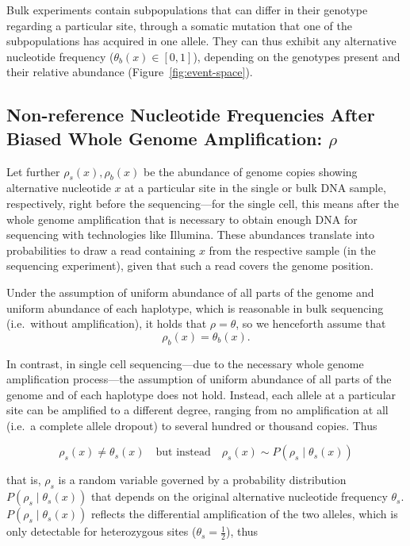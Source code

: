 \documentclass[authoryear,preprint,11pt]{scrartcl}
\newcommand{\Prob}{{P}}
\begin{document}
Bulk experiments contain subpopulations that can differ in their genotype regarding a particular site, through a somatic mutation that one of the subpopulations has acquired in one allele.
They can thus exhibit any alternative nucleotide frequency ($\theta_{b}(x) \in [0,1]$), depending on the genotypes present and their relative abundance (Figure~\ref{fig:event-space}).

\subsection{Non-reference Nucleotide Frequencies After Biased Whole Genome Amplification: $\rho$}
\label{sec.abundance}

Let further $\rho_{s}(x),\rho_{b}(x)$ be the abundance of genome copies showing alternative nucleotide $x$ at a particular site in the single or bulk DNA sample, respectively, right before the sequencing---for the single cell, this means after the whole genome amplification that is necessary to obtain enough DNA for sequencing with technologies like Illumina.
These abundances translate into probabilities to draw a read containing $x$ from the respective sample (in the sequencing experiment), given that such a read covers the genome position.

Under the assumption of uniform abundance of all parts of the genome and uniform abundance of each haplotype, which is reasonable in bulk sequencing (i.e.~without amplification), it holds that $\rho = \theta$, so we henceforth assume that
\begin{equation}
 \label{eq:rho-b}
 \rho_{b}(x) = \theta_{b}(x).
\end{equation}

In contrast, in single cell sequencing---due to the necessary whole genome amplification process---the assumption of uniform abundance of all parts of the genome and of each haplotype does not hold.
Instead, each allele at a particular site can be amplified to a different degree, ranging from no amplification at all (i.e.~a complete allele dropout) to several hundred or thousand copies.
Thus

\begin{equation}
 \label{eq.nonUniDependency}
 \rho_s(x) \ne \theta_s(x)\quad\text{but instead}\quad \rho_s(x) \sim \Prob(\rho_s \mid \theta_s(x))
\end{equation}

that is, $\rho_s$ is a random variable governed by a probability distribution ${\Prob(\rho_s \mid \theta_s(x) )}$ that depends on the original alternative nucleotide frequency $\theta_s$.
$\Prob(\rho_s \mid \theta_s(x))$ reflects the differential amplification of the two alleles, which is only detectable for heterozygous sites ($\theta_s = \frac12$), thus
\end{document}

